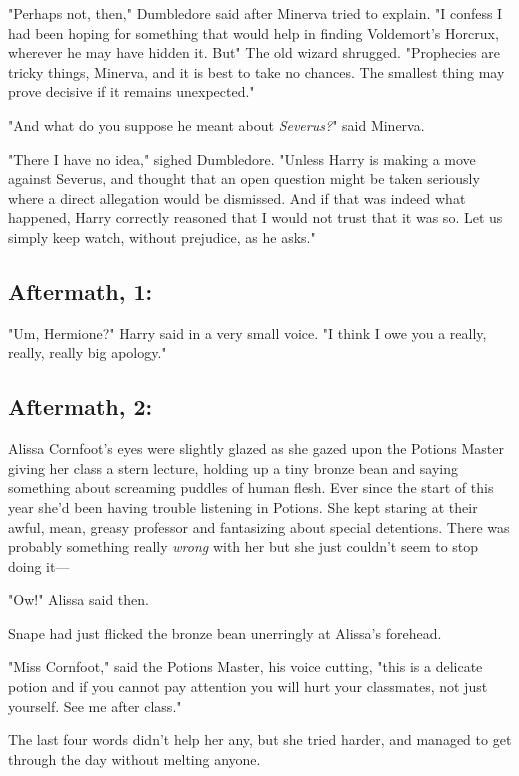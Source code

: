"Perhaps not, then," Dumbledore said after Minerva tried to explain. "I confess
I had been hoping for something that would help in finding Voldemort's Horcrux,
wherever he may have hidden it. But{\el}" The old wizard shrugged.
"Prophecies are tricky things, Minerva, and it is best to take no chances. The
smallest thing may prove decisive if it remains unexpected."

"And what do you suppose he meant about \emph{Severus?}" said Minerva.

"There I have no idea," sighed Dumbledore. "Unless Harry is making a move
against Severus, and thought that an open question might be taken seriously
where a direct allegation would be dismissed. And if that was indeed what
happened, Harry correctly reasoned that I would not trust that it was so. Let
us simply keep watch, without prejudice, as he asks."
\sbreak
\vspace{-2\baselineskip}
\subsection{Aftermath, 1:}

"Um, Hermione?" Harry said in a very small voice. "I think I owe you a really,
really, really big apology."
\sbreak
\vspace{-2\baselineskip}
\subsection{Aftermath, 2:}

Alissa Cornfoot's eyes were slightly glazed as she gazed upon the Potions
Master giving her class a stern lecture, holding up a tiny bronze bean and
saying something about screaming puddles of human flesh. Ever since the start
of this year she'd been having trouble listening in Potions. She kept staring
at their awful, mean, greasy professor and fantasizing about special
detentions. There was probably something really \emph{wrong} with her but she
just couldn't seem to stop doing it\mbox{---}

"Ow!" Alissa said then.

Snape had just flicked the bronze bean unerringly at Alissa's forehead.

"Miss Cornfoot," said the Potions Master, his voice cutting, "this is a
delicate potion and if you cannot pay attention you will hurt your classmates,
not just yourself. See me after class."

The last four words didn't help her any, but she tried harder, and managed to
get through the day without melting anyone.

